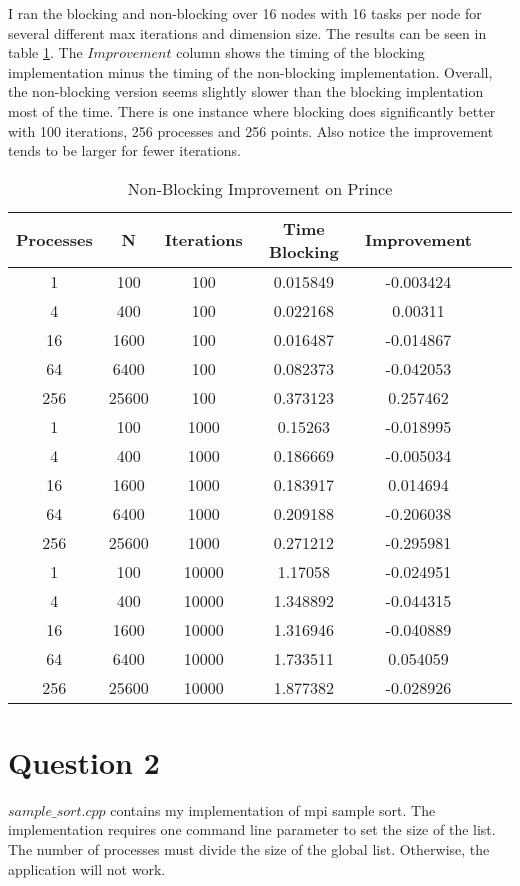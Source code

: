 \documentclass[10pt]{article}
\begin{document}
I ran the blocking and non-blocking over 16 nodes with 16 tasks per node for several different max iterations and dimension size. The results can be seen in table \ref{tab1}. The $\textit{Improvement}$ column shows the timing of the blocking implementation minus the timing of the non-blocking implementation. Overall, the non-blocking version seems slightly slower than the blocking implentation most of the time. There is one instance where blocking does significantly better with 100 iterations, 256 processes and 256 points. Also notice the improvement tends to be larger for fewer iterations.

\begin{table}[h!]
\centering
\begin{tabular}{ |c|c|c|c|c|c|c| }
\hline
Processes&	N&	Iterations&	Time Blocking&	Improvement\\
\hline
1&	100&	100&	0.015849&	-0.003424\\
4&	400&	100&	0.022168&	0.00311\\
16&	1600&	100&	0.016487&	-0.014867\\
64&	6400&	100&	0.082373&	-0.042053\\
256&	25600&	100&	0.373123&	0.257462\\
1&	100&	1000&	0.15263&	-0.018995\\
4&	400&	1000&	0.186669&	-0.005034\\
16&	1600&	1000&	0.183917&	0.014694\\
64&	6400&	1000&	0.209188&	-0.206038\\
256&	25600&	1000&	0.271212&	-0.295981\\
1&	100&	10000&	1.17058&	-0.024951\\
4&	400&	10000&	1.348892&	-0.044315\\
16&	1600&	10000&	1.316946&	-0.040889\\
64&	6400&	10000&	1.733511&	0.054059\\
256&	25600&	10000&	1.877382&	-0.028926\\
\hline
\end{tabular}
 \caption{Non-Blocking Improvement on Prince}
 \label{tab1}
 \end{table}

\newpage

\section{Question 2}

$sample\_sort.cpp$ contains my implementation of mpi sample sort. The implementation requires one command line parameter to set the size of the list. The number of processes must divide the size of the global list. Otherwise, the application will not work.\\
\end{document}
